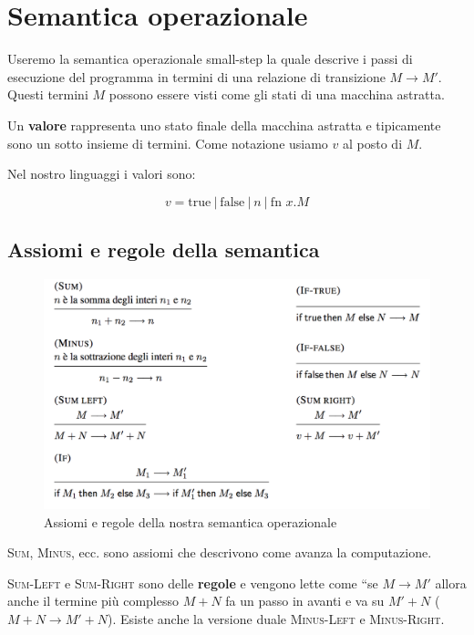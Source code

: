 

\section{Semantica operazionale}

Useremo la semantica operazionale small-step la quale descrive i passi di esecuzione del programma in termini di una relazione di transizione $M \rightarrow M'$.
Questi termini $M$ possono essere visti come gli stati di una macchina astratta.

Un \textbf{valore} rappresenta uno stato finale della macchina astratta e tipicamente sono un sotto insieme di termini. Come notazione usiamo $v$ al posto di $M$.

Nel nostro linguaggi i valori sono:

$$
v = \text{true} \: | \: \text{false} \:|\: n \: | \: \text{fn }x.M
$$

\subsection{Assiomi e regole della semantica}

\begin{figure}[htpb]
	\centering
	\includegraphics[width = 0.7\linewidth]{./images/l3-assiomi}
	\caption{Assiomi e regole della nostra semantica operazionale}
\end{figure}

\textsc{Sum}, \textsc{Minus}, ecc. sono assiomi che descrivono come avanza la computazione.

\textsc{Sum-Left} e \textsc{Sum-Right} sono delle \textbf{regole} e vengono lette come ``se $M \rightarrow M'$ allora anche il termine più complesso $M + N$ fa un passo in avanti e va su $M' + N$ ($M + N \rightarrow M' +N$). Esiste anche la versione duale \textsc{Minus-Left} e \textsc{Minus-Right}.

